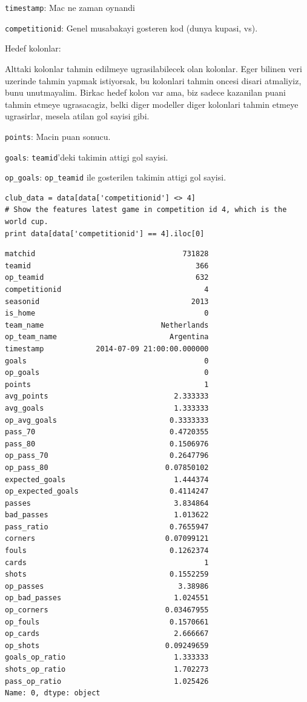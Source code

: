 \documentclass[12pt,fleqn]{article}\usepackage{../common}
\begin{document}
\verb!timestamp!: Mac ne zaman oynandi

\verb!competitionid!: Genel musabakayi gosteren kod (dunya kupasi, vs).

Hedef kolonlar:

Alttaki kolonlar tahmin edilmeye ugrasilabilecek olan kolonlar. Eger
bilinen veri uzerinde tahmin yapmak istiyorsak, bu kolonlari tahmin oncesi
disari atmaliyiz, bunu unutmayalim. Birkac hedef kolon var ama, biz
sadece kazanilan puani tahmin etmeye ugrasacagiz, belki diger modeller
diger kolonlari tahmin etmeye ugrasirlar, mesela atilan gol sayisi gibi.

\verb!points!: Macin puan sonucu.

\verb!goals!: \verb!teamid!'deki takimin attigi gol sayisi.

\verb!op_goals!: \verb!op_teamid! ile gosterilen takimin attigi gol sayisi.

\begin{verbatim}
club_data = data[data['competitionid'] <> 4]
# Show the features latest game in competition id 4, which is the world cup.
print data[data['competitionid'] == 4].iloc[0]
\end{verbatim}

\begin{verbatim}
matchid                                  731828
teamid                                      366
op_teamid                                   632
competitionid                                 4
seasonid                                   2013
is_home                                       0
team_name                           Netherlands
op_team_name                          Argentina
timestamp            2014-07-09 21:00:00.000000
goals                                         0
op_goals                                      0
points                                        1
avg_points                             2.333333
avg_goals                              1.333333
op_avg_goals                          0.3333333
pass_70                               0.4720355
pass_80                               0.1506976
op_pass_70                            0.2647796
op_pass_80                           0.07850102
expected_goals                         1.444374
op_expected_goals                     0.4114247
passes                                 3.834864
bad_passes                             1.013622
pass_ratio                            0.7655947
corners                              0.07099121
fouls                                 0.1262374
cards                                         1
shots                                 0.1552259
op_passes                               3.38986
op_bad_passes                          1.024551
op_corners                           0.03467955
op_fouls                              0.1570661
op_cards                               2.666667
op_shots                             0.09249659
goals_op_ratio                         1.333333
shots_op_ratio                         1.702273
pass_op_ratio                          1.025426
Name: 0, dtype: object
\end{verbatim}
\end{document}
